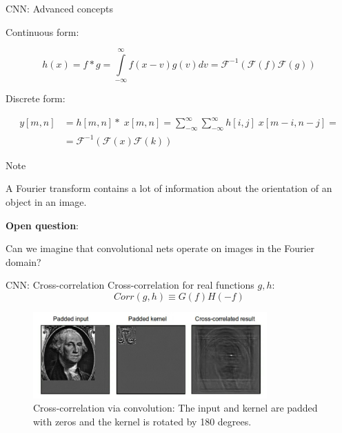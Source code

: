 \documentclass[10pt]{beamer}
\begin{document}
\begin{frame}{CNN: Advanced concepts}

\begin{block}{Continuous form:}

\begin{equation}
    h(x) = f * g = \int \limits_{-\infty}^{\infty} f(x - v) g(v) dv = \mathcal{F}^{-1}(\mathcal{F}(f) \mathcal{F}(g))
\end{equation}

\end{block}

\begin{block}{Discrete form:}

\begin{align}
    y[m, n] &= h[m, n] *\; x[m, n] = \sum \limits_{-\infty}^{\infty} \sum \limits_{-\infty}^{\infty} h[i, j]\; x[m-i, n-j] = \\
      &= \mathcal{F}^{-1}(\mathcal{F}(x) \mathcal{F}(k))
\end{align}

\end{block}

\begin{block}{Note}

A Fourier transform contains a lot of information about the orientation of an object in an image.

\end{block}

\textbf{Open question}:

Can we imagine that convolutional nets operate on images in the Fourier domain?

\end{frame}


\begin{frame}{CNN: Cross-correlation}
    Cross-correlation for real functions $g, h$: 
    \begin{equation}
        Corr(g, h) \equiv G(f) H(-f)
    \end{equation}
    
    \begin{figure}
        \centering
        \includegraphics[width=0.8\textwidth]{corr.jpg}
        \caption{Cross-correlation via convolution: The input and kernel are padded with zeros and the kernel is rotated by 180 degrees. }
    \end{figure}
\end{frame}
\end{document}
